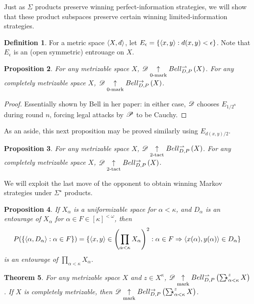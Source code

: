 \documentclass{amsart}
\newtheorem{theorem}{Theorem}[section]
\newtheorem{proposition}[theorem]{Proposition}
\theoremstyle{definition}
\newtheorem{definition}[theorem]{Definition}
\begin{document}
  Just as \(\Sigma\) products preserve winning perfect-information strategies,
  we will show that these product subspaces preserve certain
  winning limited-information strategies.

  \begin{definition}
    For a metric space \(\langle X,d\rangle\), let
    \(E_\epsilon=\{\langle x,y\rangle:d(x,y)<\epsilon\}\). Note that \(E_\epsilon\)
    is an (open symmetric) entrouage on \(X\).
  \end{definition}

  \begin{proposition}
    For any metrizable space \(X\),
    \(\mathscr{D}\underset{0\text{-mark}}{\uparrow}Bell_{D,P}^{\rightharpoonup}\left({X}\right)\).
    For any completely metrizable space \(X\),
    \(\mathscr{D}\underset{0\text{-mark}}{\uparrow}Bell_{D,P}^{\to}\left({X}\right)\).
  \end{proposition}

  \begin{proof}
    Essentially shown by Bell in her paper: in either case,
    \(\mathscr{D}\) chooses \(E_{1/2^{n}}\)
    during round \(n\), forcing legal attacks by \(\mathscr{P}\) to be Cauchy.
  \end{proof}

  As an aside, this next proposition may be proved similarly
  using \(E_{d(x,y)/2}\).

  \begin{proposition}
    For any metrizable space \(X\),
    \(\mathscr{D}\underset{2\text{-tact}}{\uparrow}Bell_{D,P}^{\rightharpoonup}\left({X}\right)\).
    For any completely metrizable space \(X\),
    \(\mathscr{D}\underset{2\text{-tact}}{\uparrow}Bell_{D,P}^{\to}\left({X}\right)\).
  \end{proposition}

  We will exploit the last move of the
  opponent to obtain winning Markov strategies under
  \(\Sigma^\star\) products.

  \begin{proposition}
    If \(X_\alpha\) is a uniformizable space for \(\alpha<\kappa\),
    and \(D_\alpha\) is an entourage of \(X_\alpha\) for
    \(\alpha\in F\in[\kappa]^{<\omega}\), then
      \[
        P(\{\langle\alpha,D_\alpha\rangle:\alpha\in F\})
          =
        \{
          \langle x,y\rangle\in\left(\prod_{\alpha<\kappa}X_\alpha\right)^2
        :
          \alpha\in F
        \Rightarrow
          \langle x(\alpha),y(\alpha)\rangle\in D_\alpha
        \}
      \]
    is an entourage of \(\prod_{\alpha<\kappa}X_\alpha\).
  \end{proposition}

  \begin{theorem}
    For any metrizable space \(X\) and \(z\in X^\kappa\),
    \(\pl D\markwin\bellConGame{\SigmaStarProd_{\alpha<\kappa}^z X}\).
    If \(X\) is completely metrizable, then
    \(\pl D\markwin\bellAbsConGame{\SigmaStarProd_{\alpha<\kappa}^z X}\).
  \end{theorem}
\end{document}
